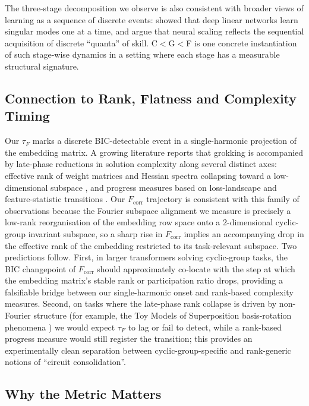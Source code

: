 \documentclass{article}
\newcommand{\tauf}{\tau_{F}}
\newcommand{\fcorr}{F_{\mathrm{corr}}}
\begin{document}
The three-stage decomposition we observe is also consistent with
broader views of learning as a sequence of discrete events:
\citet{saxe2014exact} showed that deep linear networks learn
singular modes one at a time, and \citet{michaud2023quantization}
argue that neural scaling reflects the sequential acquisition of
discrete ``quanta'' of skill.
C$<$G$<$F is one concrete instantiation of such stage-wise dynamics
in a setting where each stage has a measurable structural signature.

\subsection{Connection to Rank, Flatness and Complexity Timing}
\label{sec:rank_flatness_link}

Our $\tauf$ marks a discrete BIC-detectable event in a
single-harmonic projection of the embedding matrix.
A growing literature reports that grokking is accompanied by
late-phase reductions in solution complexity along several
distinct axes: effective rank of weight matrices and Hessian
spectra collapsing toward a low-dimensional subspace
\citep{mohamadi2024grok}, and progress measures based on
loss-landscape and feature-statistic transitions
\citep{miller2024grokking}.
Our $\fcorr$ trajectory is consistent with this family of
observations because the Fourier subspace alignment we measure is
precisely a low-rank reorganisation of the embedding row space onto
a 2-dimensional cyclic-group invariant subspace, so a sharp rise in
$\fcorr$ implies an accompanying drop in the effective rank of the
embedding restricted to its task-relevant subspace.
Two predictions follow.
First, in larger transformers solving cyclic-group tasks, the BIC
changepoint of $\fcorr$ should approximately co-locate with the
step at which the embedding matrix's stable rank or participation
ratio drops, providing a falsifiable bridge between our
single-harmonic onset and rank-based complexity measures.
Second, on tasks where the late-phase rank collapse is driven by
non-Fourier structure (for example, the Toy Models of
Superposition basis-rotation phenomena
\citep{elhage2022toy}) we would expect $\tauf$ to lag or fail to
detect, while a rank-based progress measure would still register
the transition; this provides an experimentally clean separation
between cyclic-group-specific and rank-generic notions of
``circuit consolidation''.

\subsection{Why the Metric Matters}
\end{document}
